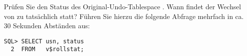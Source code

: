         \item Pr\"ufen Sie den Status des Original-Undo-Tablespace
        . Wann findet der Wechsel von 
        zu  tats\"achlich statt? F\"uhren Sie hierzu die
        folgende Abfrage mehrfach in ca. 30 Sekunden Abst\"anden aus:

        \begin{lstlisting}[language=oracle_sql]
SQL> SELECT usn, status
  2  FROM   v$rollstat;
        \end{lstlisting}
